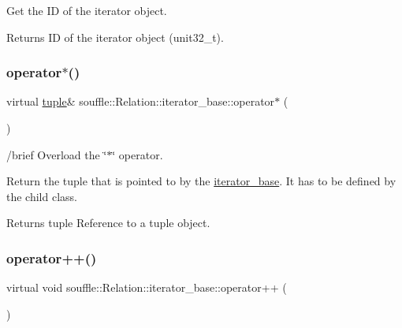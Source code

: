 Get the ID of the iterator object. \begin{DoxyReturn}{Returns}
ID of the iterator object (unit32\+\_\+t). 
\end{DoxyReturn}
\mbox{\label{classsouffle_1_1_relation_1_1iterator__base_a71a0320e9781c2ca757978d0e785ab30}} 
\subsubsection{\texorpdfstring{operator$\ast$()}{operator*()}}
{\footnotesize\ttfamily virtual \hyperlink{classsouffle_1_1tuple}{tuple}\& souffle\+::\+Relation\+::iterator\+\_\+base\+::operator$\ast$ (\begin{DoxyParamCaption}{ }\end{DoxyParamCaption})\hspace{0.3cm}{\ttfamily [pure virtual]}}

/brief Overload the \char`\"{}$\ast$\char`\"{} operator.

Return the tuple that is pointed to by the \hyperlink{classsouffle_1_1_relation_1_1iterator__base}{iterator\+\_\+base}. It has to be defined by the child class. \begin{DoxyReturn}{Returns}
tuple Reference to a tuple object. 
\end{DoxyReturn}
\mbox{\label{classsouffle_1_1_relation_1_1iterator__base_a915e207e5f5746aa25e11e38ec936147}} 
\subsubsection{\texorpdfstring{operator++()}{operator++()}}
{\footnotesize\ttfamily virtual void souffle\+::\+Relation\+::iterator\+\_\+base\+::operator++ (\begin{DoxyParamCaption}{ }\end{DoxyParamCaption})\hspace{0.3cm}{\ttfamily [pure virtual]}}

